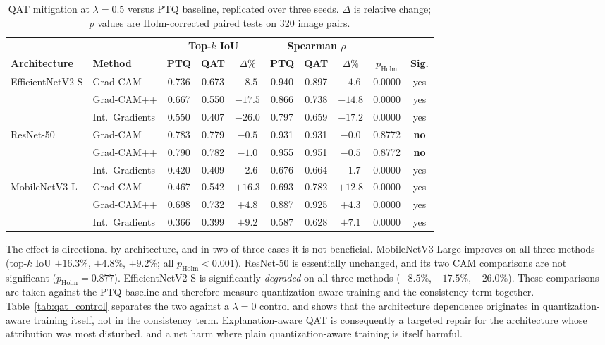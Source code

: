 \documentclass[fleqn,10pt]{wlscirep}
\begin{document}
\begin{table}[!ht]
\centering
\scriptsize
\caption{QAT mitigation at $\lambda = 0.5$ versus PTQ baseline, replicated over three seeds. $\Delta$ is relative change; $p$ values are Holm-corrected paired tests on 320 image pairs.}
\label{tab:mitigation}
\setlength{\tabcolsep}{4pt}
\begin{tabular}{ll ccc ccc cc}
\toprule
 & & \multicolumn{3}{c}{\textbf{Top-$k$ IoU}} & \multicolumn{3}{c}{\textbf{Spearman $\rho$}} & & \\
\cmidrule(lr){3-5} \cmidrule(lr){6-8}
\textbf{Architecture} & \textbf{Method} & \textbf{PTQ} & \textbf{QAT} & \textbf{$\Delta\%$} & \textbf{PTQ} & \textbf{QAT} & \textbf{$\Delta\%$} & \textbf{$p_{\text{Holm}}$} & \textbf{Sig.} \\
\midrule
\multirow{3}{*}{EfficientNetV2-S}
 & Grad-CAM & 0.736 & 0.673 & $-8.5$ & 0.940 & 0.897 & $-4.6$ & 0.0000 & yes \\
 & Grad-CAM++ & 0.667 & 0.550 & $-17.5$ & 0.866 & 0.738 & $-14.8$ & 0.0000 & yes \\
 & Int.\ Gradients & 0.550 & 0.407 & $-26.0$ & 0.797 & 0.659 & $-17.2$ & 0.0000 & yes \\
\midrule
\multirow{3}{*}{ResNet-50}
 & Grad-CAM & 0.783 & 0.779 & $-0.5$ & 0.931 & 0.931 & $-0.0$ & 0.8772 & \textbf{no} \\
 & Grad-CAM++ & 0.790 & 0.782 & $-1.0$ & 0.955 & 0.951 & $-0.5$ & 0.8772 & \textbf{no} \\
 & Int.\ Gradients & 0.420 & 0.409 & $-2.6$ & 0.676 & 0.664 & $-1.7$ & 0.0000 & yes \\
\midrule
\multirow{3}{*}{MobileNetV3-L}
 & Grad-CAM & 0.467 & 0.542 & $+16.3$ & 0.693 & 0.782 & $+12.8$ & 0.0000 & yes \\
 & Grad-CAM++ & 0.698 & 0.732 & $+4.8$ & 0.887 & 0.925 & $+4.3$ & 0.0000 & yes \\
 & Int.\ Gradients & 0.366 & 0.399 & $+9.2$ & 0.587 & 0.628 & $+7.1$ & 0.0000 & yes \\
\bottomrule
\end{tabular}
\end{table}

The effect is directional by architecture, and in two of three cases it is not beneficial. MobileNetV3-Large improves on all three methods (top-$k$ IoU $+16.3\%$, $+4.8\%$, $+9.2\%$; all $p_{\text{Holm}} < 0.001$). ResNet-50 is essentially unchanged, and its two CAM comparisons are not significant ($p_{\text{Holm}} = 0.877$). EfficientNetV2-S is significantly \emph{degraded} on all three methods ($-8.5\%$, $-17.5\%$, $-26.0\%$). These comparisons are taken against the PTQ baseline and therefore measure quantization-aware training and the consistency term together. Table~\ref{tab:qat_control} separates the two against a $\lambda = 0$ control and shows that the architecture dependence originates in quantization-aware training itself, not in the consistency term. Explanation-aware QAT is consequently a targeted repair for the architecture whose attribution was most disturbed, and a net harm where plain quantization-aware training is itself harmful.
\end{document}
